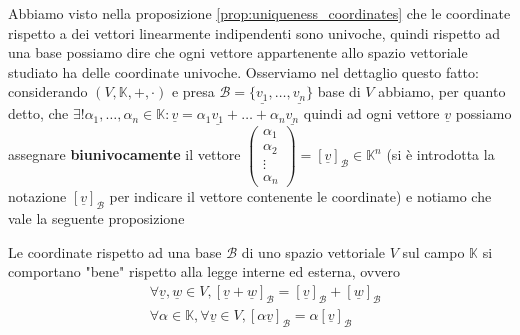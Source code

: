 Abbiamo visto nella proposizione \ref{prop:uniqueness_coordinates} che le coordinate rispetto a dei vettori linearmente indipendenti sono univoche, quindi rispetto ad una base possiamo dire che ogni vettore appartenente allo spazio vettoriale studiato
ha delle coordinate univoche. Osserviamo nel dettaglio questo fatto: considerando $(V, \mathbb{K}, +, \cdot)$ e presa $\mathcal{B} = \{ \underline{v_1}, \ldots, \underline{v_n} \}$ base di $V$ abbiamo, per quanto detto, che $\exists! \alpha_1, \ldots, \alpha_n \in \mathbb{K} : \underline{v} = \alpha_1 \underline{v_1} + \ldots + \alpha_n \underline{v_n}$ quindi ad ogni vettore $\underline{v}$ possiamo assegnare \textbf{biunivocamente} il vettore $\begin{pmatrix} \alpha_1 \\ \alpha_2 \\ \vdots \\ \alpha_n
\end{pmatrix} = [\underline{v}]_{\mathcal{B}} \in \mathbb{K}^n$ (si è introdotta la notazione $[\underline{v}]_{\mathcal{B}}$ per indicare il vettore contenente le coordinate) e notiamo che vale la seguente proposizione
\begin{prop}
    Le coordinate rispetto ad una base $\mathcal{B}$ di uno spazio vettoriale $V$ sul campo $\mathbb{K}$ si comportano "bene" rispetto alla legge interne ed esterna, ovvero
    \begin{align}
        &\forall \underline{v}, \underline{w} \in V, [\underline{v} + \underline{w}]_{\mathcal{B}} = [\underline{v}]_\mathcal{B} + [\underline{w}]_\mathcal{B} \\
        &\forall \alpha \in \mathbb{K}, \forall \underline{v} \in V, [\alpha \underline{v}]_{\mathcal{B}} = \alpha [\underline{v}]_{\mathcal{B}}
    \end{align}
\end{prop}
